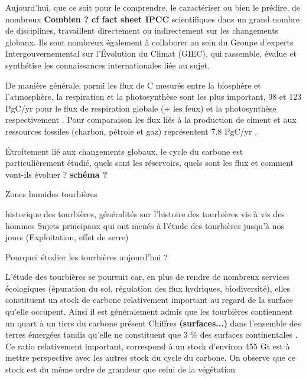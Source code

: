 \begin{linenumbers}
Aujourd'hui, que ce soit pour le comprendre, le caractériser ou bien le prédire, de nombreux \textbf{Combien ? cf fact sheet IPCC} scientifiques dans un grand nombre de disciplines, travaillent directement ou indirectement sur les changements globaux.
Ils sont nombreux également à collaborer au sein du  Groupe d'experts Intergouvernemental sur l'Évolution du Climat (GIEC), qui rassemble, évalue et synthétise les connaissances internationales liée au sujet.

De manière générale, parmi les flux de C mesurés entre la biosphère et l'atmosphère, la respiration et la photosynthèse sont les plus  important, 98 et 123 PgC/yr pour le flux de respiration globale (+ les feux) et la photosynthèse respectivement \cite{Bond-Lamberty2010,Beer2010}. Pour comparaison les flux liés à la production de ciment et aux ressources fossiles (charbon, pétrole et gaz) représentent 7.8 PgC/yr \cite{Ciais2014}.

Étroitement lié aux changements globaux, le cycle du carbone est particulièrement étudié, quels sont les réservoirs, quels sont les flux et comment vont-ils évoluer ? 
\textbf{schéma ?}


Zones humides tourbières

historique des tourbières, généralités sur l'histoire des tourbières vis à vis des hommes
Sujets principaux qui ont menés à l’étude des tourbières jusqu'à nos jours (Exploitation, effet de serre)

Pourquoi étudier les tourbières aujourd’hui ? 





L'étude des tourbières se poursuit car, en plus de rendre de nombreux services écologiques  (épuration du sol, régulation des flux hydriques, biodiversité), elles constituent un stock de carbone relativement important au regard de la surface qu'elle occupent. Ainsi il est généralement admis que les tourbières contiennent un quart à un tiers du carbone présent Chiffres \textbf{(surfaces...)} dans l'ensemble des terres émergées tandis qu'elle ne constituent que 3 \% des surfaces continentales \plop. Ce ratio relativement important, correspond à un stock d'environ 455 Gt \cite{gorham1991,turunen2002} est à mettre perspective avec les autres stock du cycle du carbone. On observe que ce stock est du même ordre de grandeur que celui de la végétation 


\end{linenumbers}
